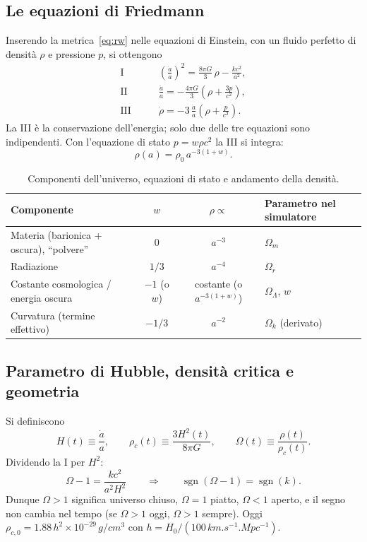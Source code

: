 \documentclass[11pt,a4paper]{article}
\newcommand{\Om}{\Omega_m}
\newcommand{\Or}{\Omega_r}
\newcommand{\OL}{\Omega_\Lambda}
\newcommand{\Ok}{\Omega_k}
\begin{document}
\subsection{Le equazioni di Friedmann}
Inserendo la metrica~\eqref{eq:rw} nelle equazioni di Einstein, con un fluido perfetto di densità $\rho$ e pressione $p$, si ottengono
\begin{align}
  \text{I}\qquad & \left(\frac{\dot a}{a}\right)^2 = \frac{8\pi G}{3}\,\rho - \frac{kc^2}{a^2}, \label{eq:f1}\\
  \text{II}\qquad & \frac{\ddot a}{a} = -\frac{4\pi G}{3}\left(\rho + \frac{3p}{c^2}\right), \label{eq:f2}\\
  \text{III}\qquad & \dot\rho = -3\,\frac{\dot a}{a}\left(\rho + \frac{p}{c^2}\right). \label{eq:f3}
\end{align}
La III è la conservazione dell'energia; solo due delle tre equazioni sono indipendenti. Con l'equazione di stato $p = w\rho c^2$ la III si integra:
\begin{equation}
  \rho(a) = \rho_0\, a^{-3(1+w)} .
\end{equation}

\begin{table}[H]\centering\small
\begin{tabular}{@{}lccl@{}}
\toprule
Componente & $w$ & $\rho\propto$ & Parametro nel simulatore\\
\midrule
Materia (barionica + oscura), ``polvere'' & $0$ & $a^{-3}$ & $\Om$\\
Radiazione & $1/3$ & $a^{-4}$ & $\Or$\\
Costante cosmologica / energia oscura & $-1$ (o $w$) & costante (o $a^{-3(1+w)}$) & $\OL$, $w$\\
Curvatura (termine effettivo) & $-1/3$ & $a^{-2}$ & $\Ok$ (derivato)\\
\bottomrule
\end{tabular}
\caption{Componenti dell'universo, equazioni di stato e andamento della densità.}
\end{table}

\subsection{Parametro di Hubble, densità critica e geometria}
Si definiscono
\begin{equation}
  H(t)\equiv\frac{\dot a}{a}, \qquad \rho_c(t)\equiv\frac{3H^2(t)}{8\pi G}, \qquad \Omega(t)\equiv\frac{\rho(t)}{\rho_c(t)} .
\end{equation}
Dividendo la I per $H^2$:
\begin{equation}
  \Omega - 1 = \frac{kc^2}{a^2H^2} \qquad\Longrightarrow\qquad \operatorname{sgn}(\Omega-1)=\operatorname{sgn}(k).
  \label{eq:segno}
\end{equation}
Dunque $\Omega>1$ significa universo chiuso, $\Omega=1$ piatto, $\Omega<1$ aperto, e il segno non cambia nel tempo (se $\Omega>1$ oggi, $\Omega>1$ sempre). Oggi $\rho_{c,0}=\num{1.88}\,h^2\times10^{-29}\,\si{g/cm^3}$ con $h=H_0/(100\,\si{km.s^{-1}.Mpc^{-1}})$.
\end{document}

